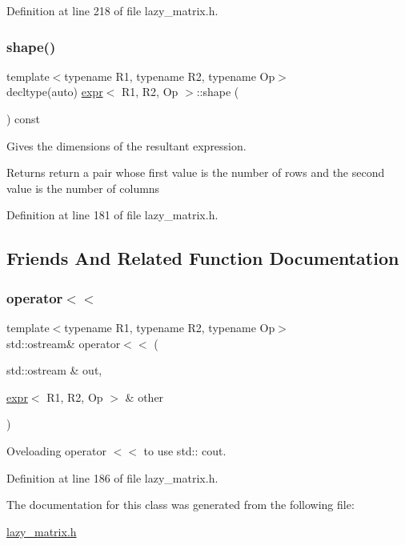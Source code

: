 Definition at line 218 of file lazy\+\_\+matrix.\+h.

\mbox{\label{classexpr_aa61617d3e742a72e3ebbe3e289c32818}} 
\subsubsection{\texorpdfstring{shape()}{shape()}}
{\footnotesize\ttfamily template$<$typename R1, typename R2, typename Op$>$ \\
decltype(auto) \mbox{\hyperlink{classexpr}{expr}}$<$ R1, R2, Op $>$\+::shape (\begin{DoxyParamCaption}{ }\end{DoxyParamCaption}) const\hspace{0.3cm}{\ttfamily [inline]}}



Gives the dimensions of the resultant expression. 

\begin{DoxyReturn}{Returns}
return a pair whose first value is the number of rows and the second value is the number of columns 
\end{DoxyReturn}


Definition at line 181 of file lazy\+\_\+matrix.\+h.



\subsection{Friends And Related Function Documentation}
\mbox{\label{classexpr_a2298d0a57665feadc1e35ac9df610dc8}} 
\subsubsection{\texorpdfstring{operator$<$$<$}{operator<<}}
{\footnotesize\ttfamily template$<$typename R1, typename R2, typename Op$>$ \\
std\+::ostream\& operator$<$$<$ (\begin{DoxyParamCaption}\item[{std\+::ostream \&}]{out,  }\item[{\mbox{\hyperlink{classexpr}{expr}}$<$ R1, R2, Op $>$ \&}]{other }\end{DoxyParamCaption})\hspace{0.3cm}{\ttfamily [friend]}}



Oveloading operator $<$$<$ to use std\+:\+: cout. 



Definition at line 186 of file lazy\+\_\+matrix.\+h.



The documentation for this class was generated from the following file\+:\begin{DoxyCompactItemize}
\item 
\mbox{\hyperlink{lazy__matrix_8h}{lazy\+\_\+matrix.\+h}}\end{DoxyCompactItemize}
